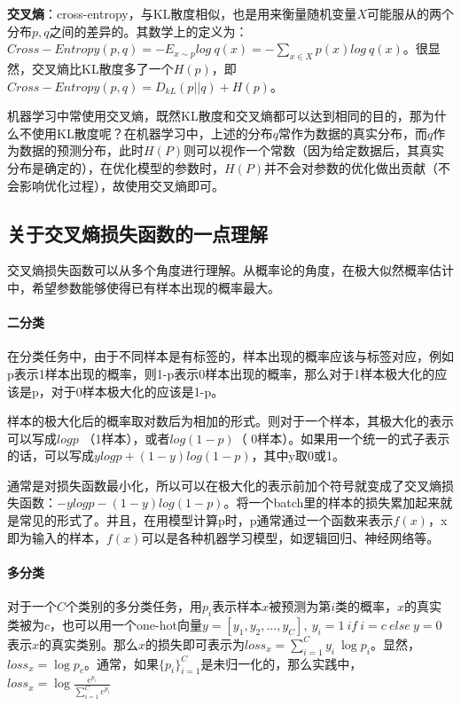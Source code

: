 \textbf{交叉熵}：\label{ce}cross-entropy，与KL散度相似，也是用来衡量随机变量$X$可能服从的两个分布$p, q$之间的差异的。其数学上的定义为：$Cross-Entropy(p, q) = -E_{x\sim p} log\ q(x) = - \sum_{x \in X}p(x)log\ q(x)$。很显然，交叉熵比KL散度多了一个$H(p)$，即$Cross-Entropy(p, q) = D_{kL}(p || q) + H(p)$。

机器学习中常使用交叉熵，既然KL散度和交叉熵都可以达到相同的目的，那为什么不使用KL散度呢？在机器学习中，上述的分布$q$常作为数据的真实分布，而$q$作为数据的预测分布，此时$H(P)$则可以视作一个常数（因为给定数据后，其真实分布是确定的），在优化模型的参数时，$H(P)$并不会对参数的优化做出贡献（不会影响优化过程），故使用交叉熵即可。

\subsection{关于交叉熵损失函数的一点理解}
交叉熵损失函数可以从多个角度进行理解。从概率论的角度，在极大似然概率估计中，希望参数能够使得已有样本出现的概率最大。

\paragraph{二分类}
在分类任务中，由于不同样本是有标签的，样本出现的概率应该与标签对应，例如p表示1样本出现的概率，则1-p表示0样本出现的概率，那么对于1样本极大化的应该是p，对于0样本极大化的应该是1-p。

样本的极大化后的概率取对数后为相加的形式。则对于一个样本，其极大化的表示可以写成$log p$ （1样本），或者$log(1-p)$（ 0样本）。如果用一个统一的式子表示的话，可以写成$y log p + (1-y) log(1-p)$，其中y取0或1。

通常是对损失函数最小化，所以可以在极大化的表示前加个符号就变成了交叉熵损失函数：$- y log p - (1-y) log(1-p)$。将一个batch里的样本的损失累加起来就是常见的形式了。并且，在用模型计算p时，p通常通过一个函数来表示$f(x)$，x即为输入的样本，$f(x)$可以是各种机器学习模型，如逻辑回归、神经网络等。


\paragraph{多分类}
对于一个$C$个类别的多分类任务，用$p_i$表示样本$x$被预测为第$i$类的概率，$x$的真实类被为$c$，也可以用一个one-hot向量$y = [y_1, y_2, ..., y_C],\ y_i = 1\ if\ i = c\ else\ y = 0$表示$x$的真实类别。那么$x$的损失即可表示为$loss_x = \sum_{i=1}^C y_i\ \log p_i$。显然，$loss_x = \log p_c$。通常，如果$\{p_i\}_{i=1}^C$是未归一化的，那么实践中，$loss_x = \log \frac{e^{p_c}}{\sum_{i=1}^C e^{p_i}}$

